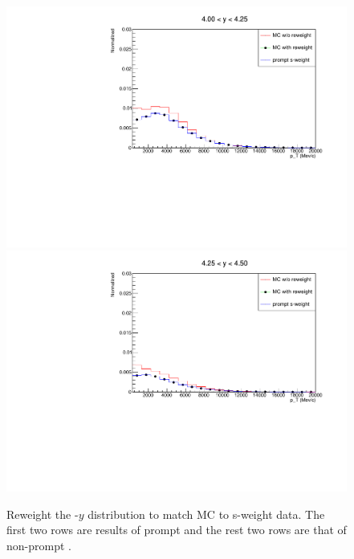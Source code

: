 \begin{figure}[h]
\begin{center}
      \includegraphics[width=0.19\linewidth]{pdf/Jpsi/reweight/Yb9.pdf}
      \includegraphics[width=0.19\linewidth]{pdf/Jpsi/reweight/Yb10.pdf}
    \end{center}
    \caption{
		Reweight the \pt-$y$ distribution to match MC to s-weight data. The first two rows are results of prompt \jpsi and the rest two rows are that of non-prompt \jpsi. } 
    \label{JreweightPTY}
\end{figure}
